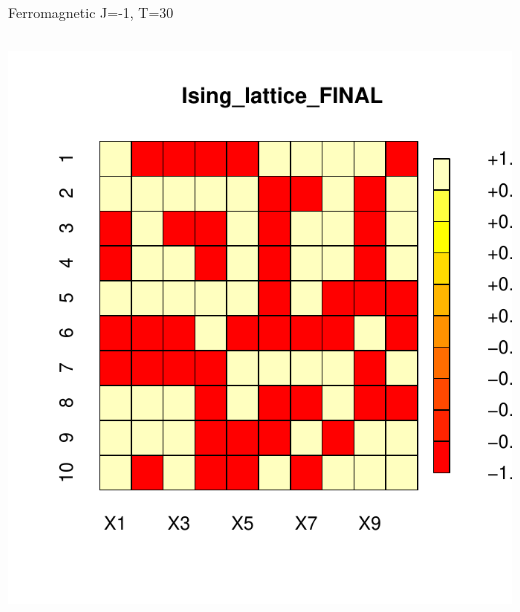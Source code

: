 \documentclass{beamer}
\begin{document}
\begin{frame}{Ferromagnetic J=-1, T=30}
\begin{columns}
\begin{column}{0.5\textwidth}
\begin{center}
     \includegraphics[width=\textwidth]{Pic/J-1_10_6000_T=30_FINAL.pdf}
     \end{center}
\end{column}
\end{columns}
\end{frame}
\end{document}
